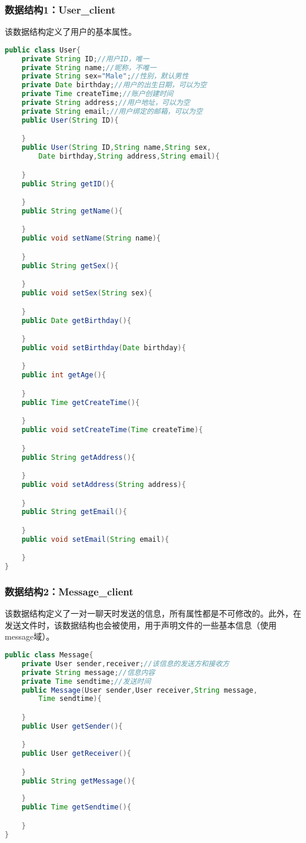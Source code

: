 \subsubsection{数据结构1：User\_client}
该数据结构定义了用户的基本属性。
\begin{lstlisting}[language=Java, caption=User定义]
public class User{
    private String ID;//用户ID，唯一
    private String name;//昵称，不唯一
    private String sex="Male";//性别，默认男性
    private Date birthday;//用户的出生日期，可以为空
    private Time createTime;//账户创建时间
    private String address;//用户地址，可以为空
    private String email;//用户绑定的邮箱，可以为空
    public User(String ID){

    }
    public User(String ID,String name,String sex,
        Date birthday,String address,String email){

    }
    public String getID(){

    }
    public String getName(){

    }
    public void setName(String name){

    }
    public String getSex(){

    }
    public void setSex(String sex){

    }
    public Date getBirthday(){

    }
    public void setBirthday(Date birthday){

    }
    public int getAge(){

    }
    public Time getCreateTime(){

    }
    public void setCreateTime(Time createTime){

    }
    public String getAddress(){

    }
    public void setAddress(String address){

    }
    public String getEmail(){

    }
    public void setEmail(String email){

    }
}
\end{lstlisting}

\subsubsection{数据结构2：Message\_client}
该数据结构定义了一对一聊天时发送的信息，所有属性都是不可修改的。此外，在发送文件时，该数据结构也会被使用，用于声明文件的一些基本信息（使用message域）。
\begin{lstlisting}[language=Java, caption=Message定义]
public class Message{
    private User sender,receiver;//该信息的发送方和接收方
    private String message;//信息内容
    private Time sendtime;//发送时间
    public Message(User sender,User receiver,String message,
        Time sendtime){

    }
    public User getSender(){

    }
    public User getReceiver(){

    }
    public String getMessage(){
        
    }
    public Time getSendtime(){

    }
}
\end{lstlisting}
    
